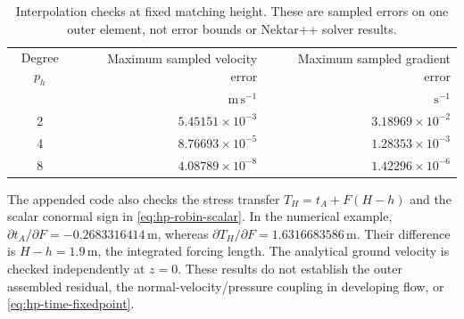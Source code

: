 \documentclass[11pt,a4paper]{article}
\numberwithin{equation}{section}
\newcommand{\units}[1]{\,\mathrm{#1}}
\begin{document}
\begin{table}[htbp]
\centering\small
\begin{tabular}{@{}crr@{}}
\toprule
Degree $p_h$ & Maximum sampled velocity error
& Maximum sampled gradient error\\
& $\mathrm{m\,s^{-1}}$ & $\mathrm{s^{-1}}$\\
\midrule
2 & $5.45151\times10^{-3}$ & $3.18969\times10^{-2}$\\
4 & $8.76693\times10^{-5}$ & $1.28353\times10^{-3}$\\
8 & $4.08789\times10^{-8}$ & $1.42296\times10^{-6}$\\
\bottomrule
\end{tabular}
\caption{Interpolation checks at fixed matching height. These are sampled
errors on one outer element, not error bounds or Nektar++ solver results.}
\label{tab:hp-projection}
\end{table}

The appended code also checks the stress transfer
$T_H=t_A+F(H-h)$ and the scalar conormal sign in
\cref{eq:hp-robin-scalar}. In the numerical example,
$\partial t_A/\partial F=-0.2683316414\units m$, whereas
$\partial T_H/\partial F=1.6316683586\units m$.
Their difference is $H-h=1.9\units m$, the integrated forcing length.
The analytical ground velocity is checked independently at $z=0$.
These results do not establish the outer assembled residual, the
normal-velocity/pressure coupling in developing flow, or
\cref{eq:hp-time-fixedpoint}.
\end{document}
